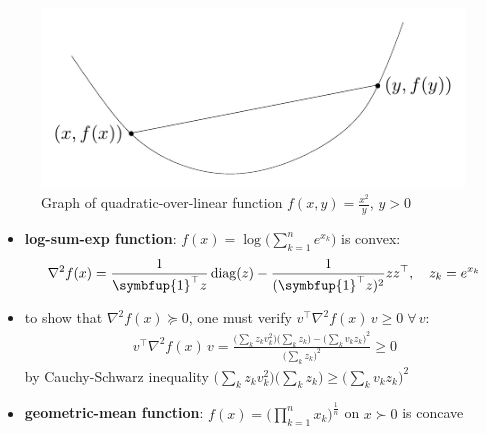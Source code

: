 \documentclass[11pt]{extarticle}
\newcommand{\ds}{\displaystyle}
\DeclareMathOperator*{\diag}{diag}
\theoremstyle{definition}
\begin{document}
\begin{figure}[!htbp]
  \centering
  \includegraphics[scale=1.1,page=3]{fig/03.pdf}
  \caption{Graph of quadratic-over-linear function $\ds f(x, y) = \frac{x^2}{y}$, $y > 0$}
\end{figure}
\begin{itemize}
  \item {\bf log-sum-exp function}: $\ds f(x) = \log\Big(\sum_{k = 1}^n e^{x_k}\Big)$ is convex:
    \begin{align*}
      \nabla^2 f(x) = \frac{1}{\symbfup{1}^\top z}\diag(z) - \frac{1}{(\symbfup{1}^\top z)^2}zz^\top, \quad z_k = e^{x_k}
    \end{align*}
  \item to show that $\nabla^2 f(x)\succcurlyeq 0$, one must verify $\ds v^\top\nabla^2 f(x)\,v\geqslant 0\;\forall\,v$:
    \begin{align*}  
      v^\top\nabla^2 f(x)\,v = \frac{\big(\sum_k z_k v_k^2\big)\big(\sum_k z_k\big) - \big(\sum_k v_k z_k\big)^2}{\big(\sum_k z_k\big)^2}\geqslant 0
    \end{align*}
  by Cauchy-Schwarz inequality $\ds \big(\sum_k z_k v_k^2\big)\big(\sum_k z_k\big) \geqslant \big(\sum_k v_k z_k\big)^2$
  \item {\bf geometric-mean function}: $\ds f(x) = \Big(\prod_{k = 1}^n x_k\Big)^{\frac{1}{n}}$ on $x\succ 0$ is concave
\end{itemize}

\newpage
\end{document}
